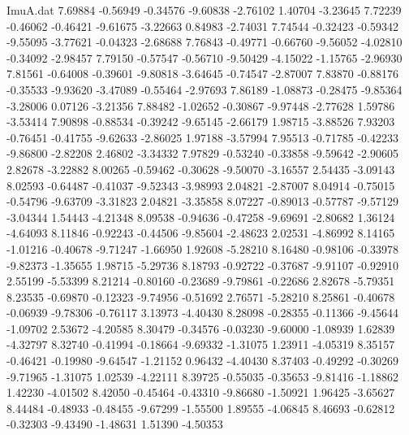 \begin{filecontents}{ImuA.dat}
   7.69884   -0.56949   -0.34576   -9.60838   -2.76102    1.40704   -3.23645
   7.72239   -0.46062   -0.46421   -9.61675   -3.22663    0.84983   -2.74031
   7.74544   -0.32423   -0.59342   -9.55095   -3.77621   -0.04323   -2.68688
   7.76843   -0.49771   -0.66760   -9.56052   -4.02810   -0.34092   -2.98457
   7.79150   -0.57547   -0.56710   -9.50429   -4.15022   -1.15765   -2.96930
   7.81561   -0.64008   -0.39601   -9.80818   -3.64645   -0.74547   -2.87007
   7.83870   -0.88176   -0.35533   -9.93620   -3.47089   -0.55464   -2.97693
   7.86189   -1.08873   -0.28475   -9.85364   -3.28006    0.07126   -3.21356
   7.88482   -1.02652   -0.30867   -9.97448   -2.77628    1.59786   -3.53414
   7.90898   -0.88534   -0.39242   -9.65145   -2.66179    1.98715   -3.88526
   7.93203   -0.76451   -0.41755   -9.62633   -2.86025    1.97188   -3.57994
   7.95513   -0.71785   -0.42233   -9.86800   -2.82208    2.46802   -3.34332
   7.97829   -0.53240   -0.33858   -9.59642   -2.90605    2.82678   -3.22882
   8.00265   -0.59462   -0.30628   -9.50070   -3.16557    2.54435   -3.09143
   8.02593   -0.64487   -0.41037   -9.52343   -3.98993    2.04821   -2.87007
   8.04914   -0.75015   -0.54796   -9.63709   -3.31823    2.04821   -3.35858
   8.07227   -0.89013   -0.57787   -9.57129   -3.04344    1.54443   -4.21348
   8.09538   -0.94636   -0.47258   -9.69691   -2.80682    1.36124   -4.64093
   8.11846   -0.92243   -0.44506   -9.85604   -2.48623    2.02531   -4.86992
   8.14165   -1.01216   -0.40678   -9.71247   -1.66950    1.92608   -5.28210
   8.16480   -0.98106   -0.33978   -9.82373   -1.35655    1.98715   -5.29736
   8.18793   -0.92722   -0.37687   -9.91107   -0.92910    2.55199   -5.53399
   8.21214   -0.80160   -0.23689   -9.79861   -0.22686    2.82678   -5.79351
   8.23535   -0.69870   -0.12323   -9.74956   -0.51692    2.76571   -5.28210
   8.25861   -0.40678   -0.06939   -9.78306   -0.76117    3.13973   -4.40430
   8.28098   -0.28355   -0.11366   -9.45644   -1.09702    2.53672   -4.20585
   8.30479   -0.34576   -0.03230   -9.60000   -1.08939    1.62839   -4.32797
   8.32740   -0.41994   -0.18664   -9.69332   -1.31075    1.23911   -4.05319
   8.35157   -0.46421   -0.19980   -9.64547   -1.21152    0.96432   -4.40430
   8.37403   -0.49292   -0.30269   -9.71965   -1.31075    1.02539   -4.22111
   8.39725   -0.55035   -0.35653   -9.81416   -1.18862    1.42230   -4.01502
   8.42050   -0.45464   -0.43310   -9.86680   -1.50921    1.96425   -3.65627
   8.44484   -0.48933   -0.48455   -9.67299   -1.55500    1.89555   -4.06845
   8.46693   -0.62812   -0.32303   -9.43490   -1.48631    1.51390   -4.50353

\end{filecontents}
